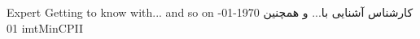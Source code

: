 
\jobPositionC
{Expert}
{Getting to know with... and so on}
{کارشناس}
{آشنایی با... و همچنین}
{\parttime}
{}
{\today}
{imtMinCPII}
